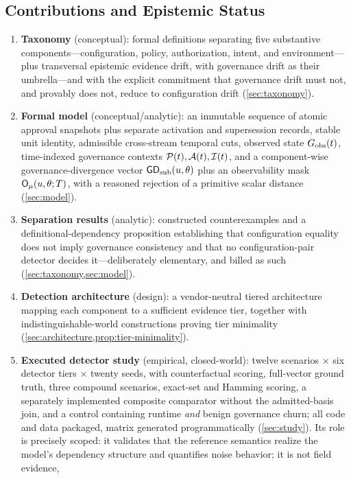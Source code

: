 \subsection{Contributions and Epistemic Status}
\begin{enumerate}[label=\textbf{C\arabic*.},leftmargin=2.2em,itemsep=1.5pt,topsep=2pt]
\item \textbf{Taxonomy} (conceptual): formal definitions separating
five substantive components---configuration, policy, authorization, intent,
and environment---plus transversal epistemic evidence drift, with governance
drift as their umbrella---and with the explicit
commitment that governance drift must not, and provably does not, reduce to
configuration drift (\cref{sec:taxonomy}).
\item \textbf{Formal model} (conceptual/analytic): an immutable sequence of
atomic approval snapshots plus separate activation and supersession records,
stable unit identity, admissible cross-stream temporal cuts, observed state $G_{\mathrm{obs}}(t)$, time-indexed governance contexts
$\mathcal{P}(t), \mathcal{A}(t), \mathcal{I}(t)$, and a component-wise governance-divergence vector
$\mathsf{GD}_{\mathrm{sub}}(u,\theta)$ plus an observability mask $\mathsf{O}_{\mu}(u,\theta;T)$, with a reasoned rejection of a primitive scalar distance
(\cref{sec:model}).
\item \textbf{Separation results} (analytic): constructed counterexamples and
a definitional-dependency proposition establishing that configuration
equality does not imply governance consistency and that no configuration-pair
detector decides it---deliberately elementary, and billed as such
(\cref{sec:taxonomy,sec:model}).
\item \textbf{Detection architecture} (design): a vendor-neutral tiered
architecture mapping each component to a sufficient evidence tier, together
with indistinguishable-world constructions proving tier minimality
(\cref{sec:architecture,prop:tier-minimality}).
\item \textbf{Executed detector study} (empirical, closed-world): twelve
scenarios $\times$ six detector tiers $\times$ twenty seeds, with
counterfactual scoring, full-vector ground truth, three compound scenarios,
exact-set and Hamming scoring, a separately implemented composite comparator without the
admitted-basis join, and a control containing
runtime \emph{and} benign governance churn; all code and data packaged,
matrix generated programmatically (\cref{sec:study}). Its role is precisely
scoped: it validates that the reference semantics realize the model's
dependency structure and quantifies noise behavior; it is not field evidence,

\end{enumerate}
